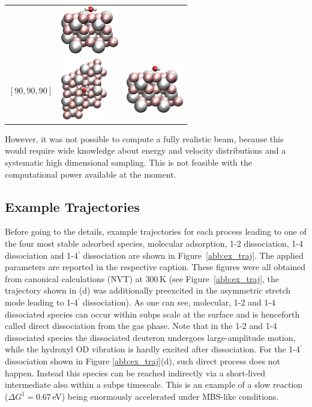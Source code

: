 \documentclass[11pt,DIV=13,BCOR=5mm,a4paper,headinclude]{scrbook}
\begin{document}
\begin{table}[!h]
\begin{tabular}{cp{4cm}p{4cm}}
& \includegraphics[width=2.5cm]{figures/0001/Ausrichtungsbilder/90_90_0-sidetest.png}\\
$[90, 90, 90]$ & \includegraphics[width=2cm,angle=90]{figures/0001/Ausrichtungsbilder/90_90_90-toptest.png} 
& \includegraphics[width=2.5cm]{figures/0001/Ausrichtungsbilder/90_90_90-sidetest.png}\\\bottomrule
\end{tabular}
 \label{tab:orientations}
\end{table}
However, it was not possible to compute a fully realistic beam, because this would require wide knowledge about energy and velocity distributions and a systematic high dimensional sampling.
This is not feasible with the computational power available at the moment.

\subsection{Example Trajectories}
Before going to the details, example trajectories for each process leading to one of the four most stable adsorbed species, molecular adsorption, 1-2 dissociation, 1-4 dissociation and 1-4$^\prime$ dissociation are shown in Figure~\ref{abb:ex_traj}.
The applied parameters are reported in the respective caption.
These figures were all obtained from canonical calculations (NVT) at $300\,$K (see Figure~\ref{abb:ex_traj}, the trajectory shown in (d) was additionally preexcited in the asymmetric stretch mode leading to 1-4$^\prime$ dissociation).
As one can see, molecular, 1-2 and 1-4 dissociated species can occur within subps scale at the surface and is henceforth called direct dissociation from the gas phase.
Note that in the 1-2 and 1-4 dissociated species the dissociated deuteron undergoes large-amplitude motion, while the hydroxyl OD vibration is hardly excited after dissociation.
For the 1-4$^\prime$ dissociation shown in Figure \ref{abb:ex_traj}(d), such direct process does not happen.
Instead this species can be reached indirectly via a short-lived intermediate also within a subps timescale. %
This is an example of a slow reaction ($\Delta G^\ddagger=0.67\,$eV) being enormously accelerated under MBS-like conditions.
\end{document}
